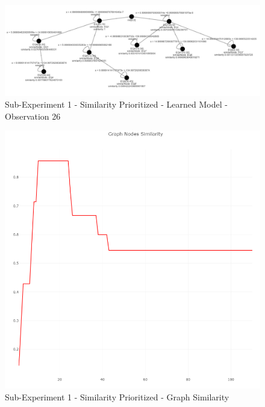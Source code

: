 \begin{figure}[h]
	\centering
	\includegraphics[scale=0.38]{./pictures/similarity_experiment/learnedModel_Obs26.png}
	\caption{Sub-Experiment 1 - Similarity Prioritized - Learned Model - Observation 26}
	\label{experiment_similarity_threshold_2}
\end{figure}

\newpage

\begin{figure}[h]
	\centering
	\includegraphics[scale=0.7]{./pictures/similarity_experiment/similarity.png}
	\caption{Sub-Experiment 1 - Similarity Prioritized - Graph Similarity}
	\label{experiment_similarity_threshold_sim}
\end{figure}

\newpage

